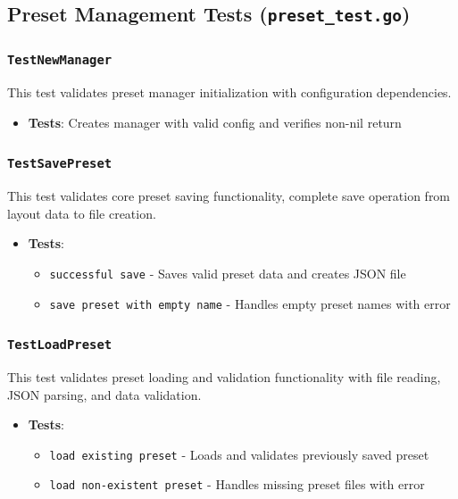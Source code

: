 \subsection{Preset Management Tests (\texttt{preset\_test.go})}

\subsubsection*{\texttt{TestNewManager}}
This test validates preset manager initialization with configuration dependencies.
\begin{itemize}
    \item \textbf{Tests}: Creates manager with valid config and verifies non-nil return
\end{itemize}

\subsubsection*{\texttt{TestSavePreset}}
This test validates core preset saving functionality, complete save operation from layout data to file creation.
\begin{itemize}
    \item \textbf{Tests}:
    \begin{itemize}
        \item \texttt{successful save} - Saves valid preset data and creates JSON file
        \item \texttt{save preset with empty name} - Handles empty preset names with error
    \end{itemize}
\end{itemize}

\subsubsection*{\texttt{TestLoadPreset}}
This test validates preset loading and validation functionality with file reading, JSON parsing, and data validation.
\begin{itemize}
    \item \textbf{Tests}:
    \begin{itemize}
        \item \texttt{load existing preset} - Loads and validates previously saved preset
        \item \texttt{load non-existent preset} - Handles missing preset files with error
    \end{itemize}
\end{itemize}

